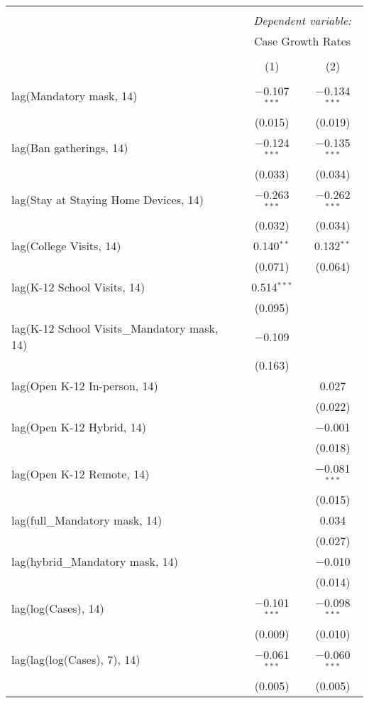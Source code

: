 \begin{tabular}{@{\extracolsep{1pt}}lcc} 
\\[-1.8ex]\hline 
\hline \\[-1.8ex] 
 & \multicolumn{2}{c}{\textit{Dependent variable:}} \\ 
\cline{2-3} 
 & \multicolumn{2}{c}{Case Growth Rates} \\ 
\\[-1.8ex] & (1) & (2)\\ 
\hline \\[-1.8ex] 
 lag(Mandatory mask, 14) & $-$0.107$^{***}$ & $-$0.134$^{***}$ \\ 
  & (0.015) & (0.019) \\ 
  lag(Ban gatherings, 14) & $-$0.124$^{***}$ & $-$0.135$^{***}$ \\ 
  & (0.033) & (0.034) \\ 
  lag(Stay at Staying Home Devices, 14) & $-$0.263$^{***}$ & $-$0.262$^{***}$ \\ 
  & (0.032) & (0.034) \\ 
  lag(College Visits, 14) & 0.140$^{**}$ & 0.132$^{**}$ \\ 
  & (0.071) & (0.064) \\ 
  lag(K-12 School Visits, 14) & 0.514$^{***}$ &  \\ 
  & (0.095) &  \\ 
  lag(K-12 School Visits\_Mandatory mask, 14) & $-$0.109 &  \\ 
  & (0.163) &  \\ 
  lag(Open K-12 In-person, 14) &  & 0.027 \\ 
  &  & (0.022) \\ 
  lag(Open K-12 Hybrid, 14) &  & $-$0.001 \\ 
  &  & (0.018) \\ 
  lag(Open K-12 Remote, 14) &  & $-$0.081$^{***}$ \\ 
  &  & (0.015) \\ 
  lag(full\_Mandatory mask, 14) &  & 0.034 \\ 
  &  & (0.027) \\ 
  lag(hybrid\_Mandatory mask, 14) &  & $-$0.010 \\ 
  &  & (0.014) \\ 
  lag(log(Cases), 14) & $-$0.101$^{***}$ & $-$0.098$^{***}$ \\ 
  & (0.009) & (0.010) \\ 
  lag(lag(log(Cases), 7), 14) & $-$0.061$^{***}$ & $-$0.060$^{***}$ \\ 
  & (0.005) & (0.005) \\ 

\end{tabular}
